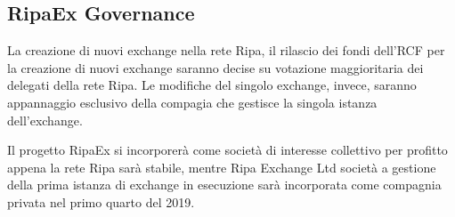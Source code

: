 \subsection{RipaEx Governance}
La creazione di nuovi exchange nella rete Ripa, il rilascio dei fondi dell'RCF per la creazione di nuovi exchange saranno decise
su votazione maggioritaria dei delegati della rete Ripa. Le modifiche del singolo exchange, invece, saranno appannaggio 
esclusivo della compagia che gestisce la singola istanza dell'exchange.

Il progetto RipaEx si incorporerà come società di interesse collettivo per profitto appena la rete Ripa sarà stabile, mentre Ripa Exchange Ltd
società a gestione della prima istanza di exchange in esecuzione sarà incorporata come compagnia privata nel primo quarto
del 2019.


